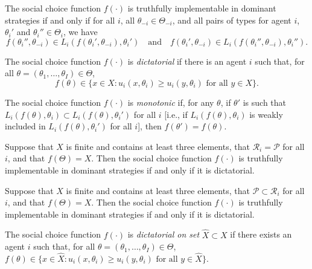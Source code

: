 \begin{prop}
    The social choice function $f(\cdot)$ is truthfully implementable in dominant strategies if and only if for all $i$, all $\theta_{-i} \in \Theta_{-i}$, and all pairs of types for agent $i$, $\theta_i'$ and $\theta_i'' \in \Theta_i$, we have
    \begin{equation*}
        f(\theta_i'', \theta_{-i}) \in L_i(f(\theta_i', \theta_{-i}), \theta_i') \quad \text{and} \quad f(\theta_i', \theta_{-i}) \in L_i(f(\theta_i'', \theta_{-i}), \theta_i'').
    \end{equation*}
\end{prop}

\begin{defn}
    The social choice function $f(\cdot)$ is \emph{dictatorial} if there is an agent $i$ such that, for all $\theta = (\theta_1, \dots, \theta_I) \in \Theta$,
    \begin{equation*}
        f(\theta) \in   \{x \in X : u_i(x, \theta_i) \geq u_i(y, \theta_i) \text{ for all } y \in X\}.
    \end{equation*}
\end{defn}

\begin{defn}
    The social choice function $f(\cdot)$ is \emph{monotonic} if, for any $\theta$, if $\theta'$ is such that $L_i(f(\theta), \theta_i) \subset L_i(f(\theta), \theta_i')$ for all $i$ [i.e., if $L_i(f(\theta), \theta_i)$ is weakly included in $L_i(f(\theta), \theta_i')$ for all $i$], then $f(\theta') = f(\theta)$.
\end{defn}

\begin{prop}
    Suppose that $X$ is finite and contains at least three elements, that $\mathscr{R}_i = \mathscr{P}$ for all $i$, and that $f(\Theta) = X$. Then the social choice function $f(\cdot)$ is truthfully implementable in dominant strategies if and only if it is dictatorial.
\end{prop}

\begin{cor}
    Suppose that $X$ is finite and contains at least three elements, that $\mathscr{P} \subset \mathscr{R}_i$ for all $i$, and that $f(\Theta) = X$. Then the social choice function $f(\cdot)$ is truthfully implementable in dominant strategies if and only if it is dictatorial.
\end{cor}

\begin{defn}
    The social choice function $f(\cdot)$ is \emph{dictatorial on set} $\hat{X} \subset X$ if there exists an agent $i$ such that, for all $\theta = (\theta_1, \dots, \theta_I) \in \Theta$, $f(\theta) \in \{x \in \hat{X} : u_i(x, \theta_i) \geq u_i(y, \theta_i) \text{ for all } y \in \hat{X}\}$.
\end{defn}

